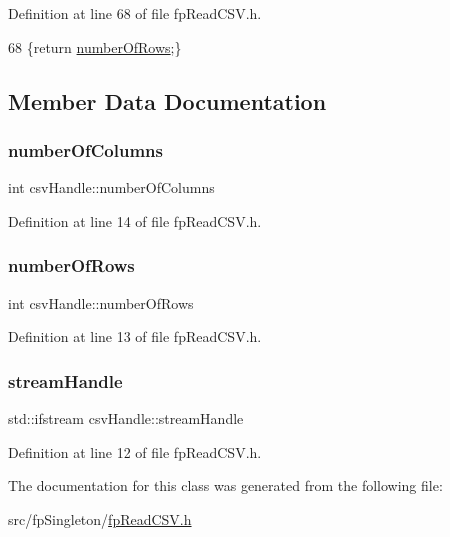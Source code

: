 Definition at line 68 of file fp\+Read\+C\+S\+V.\+h.


\begin{DoxyCode}
68 \{\textcolor{keywordflow}{return} \hyperlink{classcsvHandle_a61b2327480d1685e7fd64d4cba139ac5}{numberOfRows};\}
\end{DoxyCode}


\subsection{Member Data Documentation}
\mbox{\label{classcsvHandle_aee792b10c2ad6e21c68cfe84d6b7ff46}} 
\subsubsection{\texorpdfstring{number\+Of\+Columns}{numberOfColumns}}
{\footnotesize\ttfamily int csv\+Handle\+::number\+Of\+Columns\hspace{0.3cm}{\ttfamily [private]}}



Definition at line 14 of file fp\+Read\+C\+S\+V.\+h.

\mbox{\label{classcsvHandle_a61b2327480d1685e7fd64d4cba139ac5}} 
\subsubsection{\texorpdfstring{number\+Of\+Rows}{numberOfRows}}
{\footnotesize\ttfamily int csv\+Handle\+::number\+Of\+Rows\hspace{0.3cm}{\ttfamily [private]}}



Definition at line 13 of file fp\+Read\+C\+S\+V.\+h.

\mbox{\label{classcsvHandle_ab2900581db37409635ccfd878693fb48}} 
\subsubsection{\texorpdfstring{stream\+Handle}{streamHandle}}
{\footnotesize\ttfamily std\+::ifstream csv\+Handle\+::stream\+Handle\hspace{0.3cm}{\ttfamily [private]}}



Definition at line 12 of file fp\+Read\+C\+S\+V.\+h.



The documentation for this class was generated from the following file\+:\begin{DoxyCompactItemize}
\item 
src/fp\+Singleton/\hyperlink{fpReadCSV_8h}{fp\+Read\+C\+S\+V.\+h}\end{DoxyCompactItemize}
